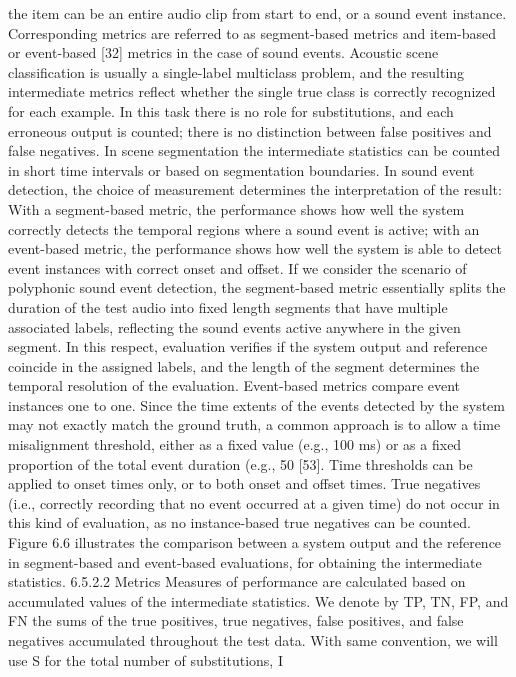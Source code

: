 the item can be an entire audio clip from start to end, or a sound event instance.
Corresponding metrics are referred to as segment-based metrics and item-based or
event-based [32] metrics in the case of sound events.
Acoustic scene classification is usually a single-label multiclass problem, and
the resulting intermediate metrics reflect whether the single true class is correctly
recognized for each example. In this task there is no role for substitutions, and each
erroneous output is counted; there is no distinction between false positives and false
negatives. In scene segmentation the intermediate statistics can be counted in short
time intervals or based on segmentation boundaries.
In sound event detection, the choice of measurement determines the interpretation of the result: With a segment-based metric, the performance shows how
well the system correctly detects the temporal regions where a sound event is
active; with an event-based metric, the performance shows how well the system
is able to detect event instances with correct onset and offset. If we consider the
scenario of polyphonic sound event detection, the segment-based metric essentially
splits the duration of the test audio into fixed length segments that have multiple
associated labels, reflecting the sound events active anywhere in the given segment.
In this respect, evaluation verifies if the system output and reference coincide in the
assigned labels, and the length of the segment determines the temporal resolution of
the evaluation. Event-based metrics compare event instances one to one. Since the
time extents of the events detected by the system may not exactly match the ground
truth, a common approach is to allow a time misalignment threshold, either as a fixed
value (e.g., 100 ms) or as a fixed proportion of the total event duration (e.g., 50%
[53]. Time thresholds can be applied to onset times only, or to both onset and offset
times. True negatives (i.e., correctly recording that no event occurred at a given
time) do not occur in this kind of evaluation, as no instance-based true negatives
can be counted. Figure 6.6 illustrates the comparison between a system output
and the reference in segment-based and event-based evaluations, for obtaining the
intermediate statistics.
6.5.2.2 Metrics
Measures of performance are calculated based on accumulated values of the intermediate statistics. We denote by TP, TN, FP, and FN the sums of the true positives,
true negatives, false positives, and false negatives accumulated throughout the test
data. With same convention, we will use S for the total number of substitutions, I
